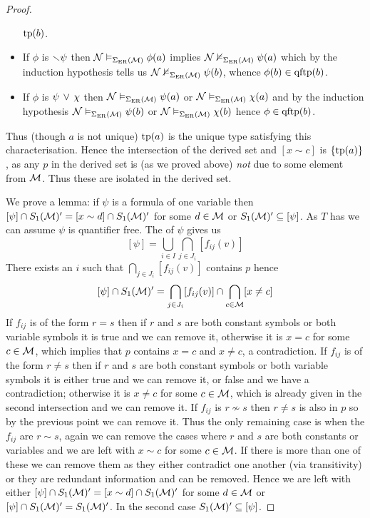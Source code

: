\begin{proof}
\begin{itemize}
            $\operatorname{tp}(b)$.
        \item If $\phi$ is $\smallsetminus \psi$ then $\mathcal{N} \vDash_{\Sigma_{\mathrm{ER}}(\mathcal{M})} \phi(a)$
            implies $\mathcal{N} \nvDash_{\Sigma_{\mathrm{ER}}(\mathcal{M})} \psi(a)$ which by the induction 
            hypothesis tells us $\mathcal{N} \nvDash_{\Sigma_{\mathrm{ER}}(\mathcal{M})} \psi(b)$, 
            whence $\phi(b) \in \operatorname{qftp}(b)$.
        \item If $\phi$ is $\psi \, \lor \, \chi$ then 
            $\mathcal{N} \vDash_{\Sigma_{\mathrm{ER}}(\mathcal{M})} \psi(a)$ or 
                $\mathcal{N} \vDash_{\Sigma_{\mathrm{ER}}(\mathcal{M})} \chi(a)$
            and by the induction hypothesis 
            $\mathcal{N} \vDash_{\Sigma_{\mathrm{ER}}(\mathcal{M})} \psi(b)$ or 
            $\mathcal{N} \vDash_{\Sigma_{\mathrm{ER}}(\mathcal{M})} \chi(b)$
            hence $\phi \in \operatorname{qftp}(b)$.
    \end{itemize}
    Thus (though $a$ is not unique) $\operatorname{tp}(a)$ is the unique type satisfying 
    this characterisation.
    Hence the intersection of the derived set and 
    $[x \sim c]$ is $\left\{\operatorname{tp}(a)\right\}$,
    as any $p$ in the derived set is (as we proved above) \emph{not} due 
    to some element from $\mathcal{M}$.
    Thus these are isolated in the derived set.

    We prove a lemma:
    if $\psi$ is a formula of one variable
    then $[\psi] \cap S_1(\mathcal{M})' = [x \sim d] \cap S_1(\mathcal{M})'$ for some 
    $d \in \mathcal{M}$ or 
    $S_1(\mathcal{M})' \subseteq [\psi]$.
    As $T$ has  
    we can assume $\psi$ is quantifier free.
    The  of $\psi$
    gives us 
    \[[\psi] = \bigcup_{i \in I} \bigcap_{j \in J_{i}} [f_{ij}(v)]\]
    There exists an $i$ such that $\bigcap_{j \in J_{i}} [f_{ij}(v)]$ 
    contains $p$ hence 
    \[  
        [\psi] \cap S_1(\mathcal{M})' =  \bigcap_{j \in J_{i}} [f_{ij}(v)] 
            \cap \bigcap_{c \in \mathcal{M}} [x \ne c]
    \]
    If $f_{ij}$ is of the form $r = s$ then if $r$ and $s$ are both constant
    symbols or both variable symbols it is true and we can remove it,
    otherwise it is $x = c$ for some $c \in \mathcal{M}$, which implies that $p$
    contains $x = c$ and $x \ne c$, a contradiction.
    If $f_{ij}$ is of the form $r \ne s$ then if $r$ and $s$ are both constant
    symbols or both variable symbols it is either true and we can remove it,
    or false and we have a contradiction;
    otherwise it is $x \ne c$ for some $c \in \mathcal{M}$, 
    which is already given in the second intersection and we can remove it.
    If $f_{ij}$ is $r \nsim s$ then $r \ne s$ is also in $p$ so by the previous
    point we can remove it.
    Thus the only remaining case is when the $f_{ij}$ are $r \sim s$,
    again we can remove the cases where $r$ and $s$ are both constants or 
    variables and we are left with $x \sim c$ for some $c \in \mathcal{M}$.
    If there is more than one of these we can remove them as they either 
    contradict one another (via transitivity) or they are redundant information
    and can be removed.
    Hence we are left with either $[\psi] \cap S_1(\mathcal{M})' = [x \sim d] 
    \cap S_1(\mathcal{M})'$ for some $d \in \mathcal{M}$ or 
    $[\psi] \cap S_1(\mathcal{M})' = S_1(\mathcal{M})'$.
    In the second case $S_1(\mathcal{M})' \subseteq [\psi]$.


\end{proof}
